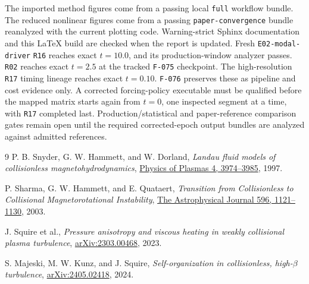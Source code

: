 \documentclass[11pt]{article}
\begin{document}
The imported method figures come from a passing local \texttt{full} workflow
bundle.  The reduced nonlinear figures come from a passing
\texttt{paper-convergence} bundle reanalyzed with the current plotting code.
Warning-strict Sphinx documentation and this \LaTeX{} build are checked when
the report is updated.  Fresh \texttt{E02-modal-driver} \texttt{R16} reaches
exact \(t=10.0\), and its production-window analyzer passes.  \texttt{R02}
reaches exact \(t=2.5\) at the tracked \texttt{F-075} checkpoint.  The
high-resolution \texttt{R17} timing lineage reaches exact \(t=0.10\).
\texttt{F-076} preserves these as pipeline and cost evidence only.  A
corrected forcing-policy executable must be qualified before the mapped
matrix starts again from \(t=0\), one inspected segment at a time, with
\texttt{R17} completed last.  Production/statistical and paper-reference
comparison gates remain open until the required corrected-epoch output bundles are
analyzed against admitted references.

\begin{thebibliography}{9}
P. B. Snyder, G. W. Hammett, and W. Dorland,
\emph{Landau fluid models of collisionless magnetohydrodynamics},
\href{https://w3.pppl.gov/~hammett/gyrofluid/papers/snyder_pop97.pdf}{Physics of Plasmas 4, 3974--3985}, 1997.

P. Sharma, G. W. Hammett, and E. Quataert,
\emph{Transition from Collisionless to Collisional Magnetorotational Instability},
\href{https://w3.pppl.gov/~hammett/gyrofluid/papers/2003/sharma03.pdf}{The Astrophysical Journal 596, 1121--1130}, 2003.

J. Squire et al.,
\emph{Pressure anisotropy and viscous heating in weakly collisional plasma
turbulence},
\href{https://arxiv.org/abs/2303.00468}{arXiv:2303.00468}, 2023.

S. Majeski, M. W. Kunz, and J. Squire,
\emph{Self-organization in collisionless, high-\(\beta\) turbulence},
\href{https://arxiv.org/abs/2405.02418}{arXiv:2405.02418}, 2024.
\end{thebibliography}
\end{document}
